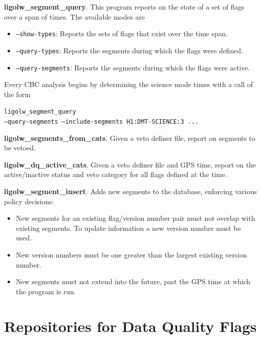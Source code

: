\textbf{ligolw\_segment\_query}.  This program reports on the state of a
set of flags over a span of times.  The available modes are

\begin{itemize}
\item \texttt{--show-types}: Reports the sets of flags that exist over
the time span.
\item \texttt{--query-types}: Reports the segments during which the
flags were defined.
\item \texttt{--query-segments}: Reports the segments during which the
flags were active.
\end{itemize}

Every CBC analysis begins by determining the science mode times with a
call of the form

\vspace*{5mm}
\texttt{ligolw\_segment\_query} \\
\hspace*{0.5in}\texttt{--query-segments --include-segments H1:DMT-SCIENCE:3 ...}
\vspace*{5mm}

\textbf{ligolw\_segments\_from\_cats}.  Given a veto definer file,
report on segments to be vetoed. 

\textbf{ligolw\_dq\_active\_cats}.  Given a veto definer file and GPS
time, report on the active/inactive status and veto category for all
flags defined at the time.

\textbf{ligolw\_segment\_insert}.  Adds new segments to the database,
enforcing various policy decisions:
\begin{itemize}
\item New segments for an existing flag/version number pair must not overlap 
with existing segments.  To update information a new version number must be used.
\item New version numbers must be one greater than the largest
existing version number.
\item New segments must not extend into the future, past the GPS time
at which the program is run.
\end{itemize}
\fi




\section{Repositories for Data Quality Flags}

